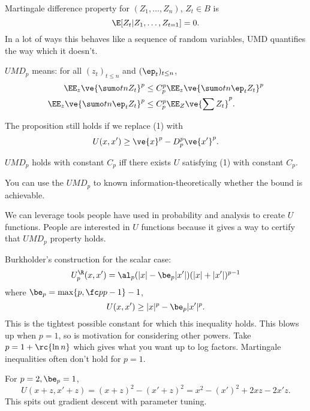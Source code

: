 Martingale difference property for $(Z_1,\ldots, Z_n)$, $Z_t\in B$ is
$$
\E[Z_t|Z_1,\ldots, Z_{t=1}] = 0.
$$
In a lot of ways this behaves like a sequence of random variables, UMD quantifies the way which it doesn't.

\begin{df}
$UMD_p$ means: for all $(z_t)_{t\le n}$ and $(\ep_t)_{t\le n}$, 
\begin{align}
\EE_z \ve{\sumo tn Z_t}^p &\le C_p^p \EE_z \ve{\sumo tn \ep_t Z_t}^p\\
\EE_z \ve{\sumo tn \ep_t Z_t}^p &\le C_p^p \EE_Z\ve{\sum Z_t}^p.
\end{align}
\end{df}
The proposition still holds if we replace (1) with
$$
U(x,x') \ge \ve{x}^p - D_p^p\ve{x'}^p.
$$
\begin{thm}[Burkholder 1984]
$UMD_p$ holds with constant $C_p$ iff there exists $U$ satisfying (1) with constant $C_p$.
\end{thm}
You can use the $UMD_p$ to known information-theoretically whether the bound is achievable.

We can leverage tools people have used in probability and analysis to create $U$ functions. People are interested in $U$ functions because it gives a way to certify that $UMD_p$ property holds.

Burkholder's construction for the scalar case:
$$U_p^{\R}(x,x')=\al_p(|x|- \be_p|x'|)(|x|+|x'|)^{p-1}$$ 
where $\be_p=\max\{p,\fc p{p-1}\} - 1$, 
$$
U(x,x') \ge |x|^p - \be_p|x'|^p.
$$
This is the tightest possible constant for which this inequality holds. This blows up when $p=1$, so is motivation for considering other powers. Take $p=1+\rc{\ln n}$ which gives what you want up to log factors. Martingale inequalities often don't hold for $p=1$.

For $p=2, \be_p=1$,
$$
U(x+z,x'+z) = (x+z)^2 - (x'+z)^2 = x^2-(x')^2 + 2xz - 2x'z.
$$
This spits out gradient descent with parameter tuning.


